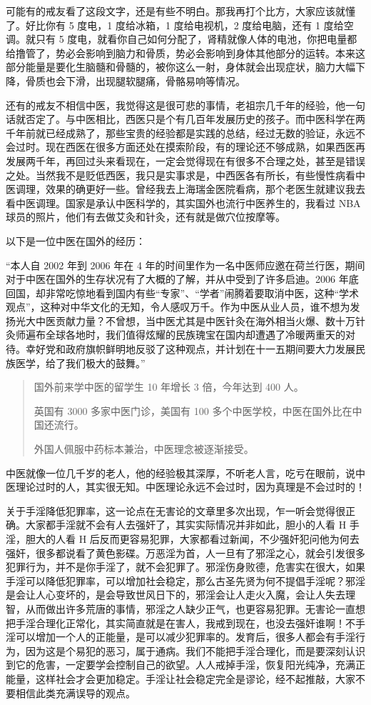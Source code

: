 \documentclass{ctexart}
\begin{document}
可能有的戒友看了这段文字，还是有些不明白。那我再打个比方，大家应该就懂了。好比你有 5 度电，1 度给冰箱，1 度给电视机，2 度给电脑，还有 1 度给空调。就只有 5 度电，就看你自己如何分配了，肾精就像人体的电池，你把电量都给撸管了，势必会影响到脑力和骨质，势必会影响到身体其他部分的运转。本来这部分能量是要化生脑髓和骨髓的，被你这么一射，身体就会出现症状，脑力大幅下降，骨质也会下滑，出现腿软腿痛，骨骼易响等情况。

还有的戒友不相信中医，我觉得这是很可悲的事情，老祖宗几千年的经验，他一句话就否定了。与中医相比，西医只是个有几百年发展历史的孩子。而中医科学在两千年前就已经成熟了，那些宝贵的经验都是实践的总结，经过无数的验证，永远不会过时。现在西医在很多方面还处在摸索阶段，有的理论还不够成熟，如果西医再发展两千年，再回过头来看现在，一定会觉得现在有很多不合理之处，甚至是错误之处。当然我不是贬低西医，我只是实事求是，中西医各有所长，有些慢性病看中医调理，效果的确更好一些。曾经我去上海瑞金医院看病，那个老医生就建议我去看中医调理。国家是承认中医科学的，其实国外也流行中医养生的，我看过 NBA 球员的照片，他们有去做艾灸和针灸，还有就是做穴位按摩等。

以下是一位中医在国外的经历：

“本人自 2002 年到 2006 年在 4 年的时间里作为一名中医师应邀在荷兰行医，期间对于中医在国外的生存状况有了大概的了解，并从中受到了许多启迪。2006 年底回国，却非常吃惊地看到国内有些“专家”、“学者”闹腾着要取消中医，这种“学术观点”，这种对中华文化的无知，令人感叹万千。作为中医从业人员，谁不想为发扬光大中医贡献力量？不曾想，当中医尤其是中医针灸在海外相当火爆、数十万针灸师遍布全球各地时，我们值得炫耀的民族瑰宝在国内却遭遇了冷暖两重天的对待。幸好党和政府旗帜鲜明地反驳了这种观点，并计划在十一五期间要大力发展民族医学，给了我们极大的鼓舞。”

\begin{quotation}
    国外前来学中医的留学生 10 年增长 3 倍，今年达到 400 人。

    英国有 3000 多家中医门诊，美国有 100 多个中医学校，中医在国外比在中国还流行。

    外国人佩服中药标本兼治，中医理念被逐渐接受。
\end{quotation}

中医就像一位几千岁的老人，他的经验极其深厚，不听老人言，吃亏在眼前，说中医理论过时的人，其实很无知。中医理论永远不会过时，因为真理是不会过时的！

关于手淫降低犯罪率，这一论点在无害论的文章里多次出现，乍一听会觉得很正确。大家都手淫就不会有人去强奸了，其实实际情况并非如此，胆小的人看 H 手淫，胆大的人看 H 后反而更容易犯罪，大家都看过新闻，不少强奸犯问他为何去强奸，很多都说看了黄色影碟。万恶淫为首，人一旦有了邪淫之心，就会引发很多犯罪行为，并不是你手淫了，就不会犯罪了。邪淫伤身败德，危害实在很大，如果手淫可以降低犯罪率，可以增加社会稳定，那么古圣先贤为何不提倡手淫呢？邪淫是会让人心变坏的，是会导致世风日下的，邪淫会让人走火入魔，会让人失去理智，从而做出许多荒唐的事情，邪淫之人缺少正气，也更容易犯罪。无害论一直想把手淫合理化正常化，其实简直就是在害人，我戒到现在，也没去强奸谁啊！不手淫可以增加一个人的正能量，是可以减少犯罪率的。发育后，很多人都会有手淫行为，因为这是个易犯的恶习，属于通病。我们不能把手淫合理化，而是要深刻认识到它的危害，一定要学会控制自己的欲望。人人戒掉手淫，恢复阳光纯净，充满正能量，这样社会才会更加稳定。手淫让社会稳定完全是谬论，经不起推敲，大家不要相信此类充满误导的观点。
\end{document}
